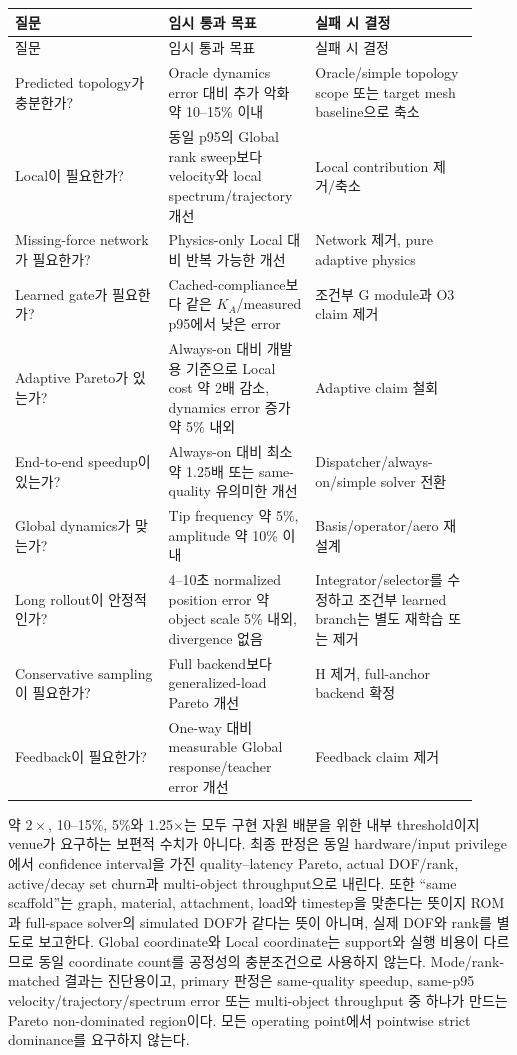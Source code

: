 \documentclass[11pt,a4paper]{article}
\begin{document}
\begin{longtable}{L{0.31\linewidth}L{0.28\linewidth}L{0.33\linewidth}}
\toprule
질문 & 임시 통과 목표 & 실패 시 결정 \\
\midrule
\endfirsthead
\toprule
질문 & 임시 통과 목표 & 실패 시 결정 \\
\midrule
\endhead
Predicted topology가 충분한가? & Oracle dynamics error 대비 추가 악화 약 10--15\% 이내 & Oracle/simple topology scope 또는 target mesh baseline으로 축소 \\
\addlinespace
Local이 필요한가? & 동일 p95의 Global rank sweep보다 velocity와 local spectrum/trajectory 개선 & Local contribution 제거/축소 \\
\addlinespace
Missing-force network가 필요한가? & Physics-only Local 대비 반복 가능한 개선 & Network 제거, pure adaptive physics \\
\addlinespace
Learned gate가 필요한가? & Cached-compliance보다 같은 \(K_A\)/measured p95에서 낮은 error & 조건부 G module과 O3 claim 제거 \\
\addlinespace
Adaptive Pareto가 있는가? & Always-on 대비 개발용 기준으로 Local cost 약 2배 감소, dynamics error 증가 약 5\% 내외 & Adaptive claim 철회 \\
\addlinespace
End-to-end speedup이 있는가? & Always-on 대비 최소 약 1.25배 또는 same-quality 유의미한 개선 & Dispatcher/always-on/simple solver 전환 \\
\addlinespace
Global dynamics가 맞는가? & Tip frequency 약 5\%, amplitude 약 10\% 이내 & Basis/operator/aero 재설계 \\
\addlinespace
Long rollout이 안정적인가? & 4--10초 normalized position error 약 object scale 5\% 내외, divergence 없음 & Integrator/selector를 수정하고 조건부 learned branch는 별도 재학습 또는 제거 \\
\addlinespace
Conservative sampling이 필요한가? & Full backend보다 generalized-load Pareto 개선 & H 제거, full-anchor backend 확정 \\
\addlinespace
Feedback이 필요한가? & One-way 대비 measurable Global response/teacher error 개선 & Feedback claim 제거 \\
\bottomrule
\end{longtable}

약 \(2\times\), 10--15\%, 5\%와 1.25\(\times\)는 모두 구현 자원 배분을 위한
내부 threshold이지 venue가 요구하는 보편적 수치가 아니다.
최종 판정은 동일 hardware/input privilege에서 confidence interval을 가진
quality--latency Pareto, actual DOF/rank, active/decay set churn과 multi-object throughput으로 내린다.
또한 ``same scaffold''는 graph, material, attachment, load와 timestep을 맞춘다는 뜻이지
ROM과 full-space solver의 simulated DOF가 같다는 뜻이 아니며, 실제 DOF와 rank를 별도로 보고한다.
Global coordinate와 Local coordinate는 support와 실행 비용이 다르므로 동일 coordinate count를
공정성의 충분조건으로 사용하지 않는다. Mode/rank-matched 결과는 진단용이고,
primary 판정은 same-quality speedup, same-p95 velocity/trajectory/spectrum error 또는
multi-object throughput 중 하나가 만드는 Pareto non-dominated region이다.
모든 operating point에서 pointwise strict dominance를 요구하지 않는다.
\end{document}
